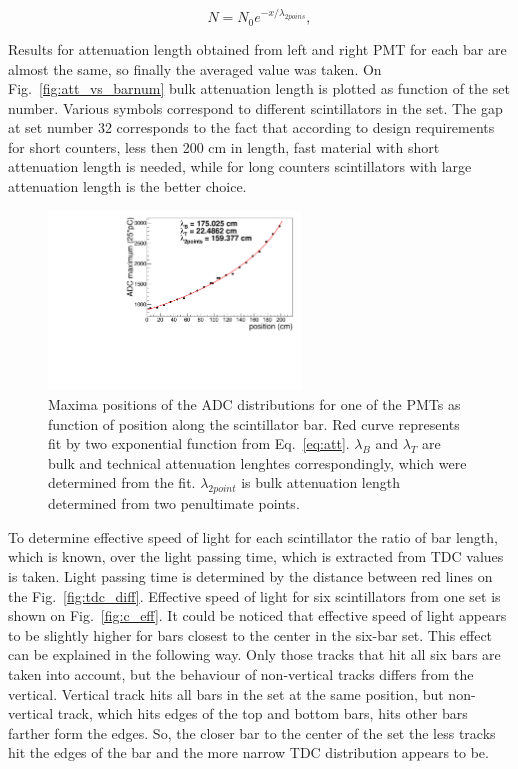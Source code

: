 \begin{equation}
N = N_{0}e^{-x/{\lambda_{2 poins}}}, \label{eq:att_2_points}
\end{equation}

Results for attenuation length obtained from left and right PMT for each bar are almost the same, so finally the averaged value was taken.
On Fig.~\ref{fig:att_vs_barnum} bulk attenuation length is plotted as function of the set number. Various symbols correspond to different scintillators in the set. The gap at set number 32 corresponds to the fact that according to design requirements for short counters, less then 200 cm in length, fast material with short attenuation length is needed, while for long counters scintillators with large attenuation length is the better choice.

\begin{figure}[]
\centering
\includegraphics[width=0.6\textwidth]{gleb/fig_gleb_att_length/att_length.pdf}
\caption{Maxima positions of the ADC distributions for one of the PMTs as function of position along the scintillator bar. Red curve represents fit by two exponential function from Eq.~\ref{eq:att}. $\lambda_{B}$ and $\lambda_{T}$ are bulk and technical attenuation lenghtes correspondingly, which were determined from the fit. $\lambda_{2point}$ is bulk attenuation length determined from two penultimate points. \label{fig:attlength}}
\end{figure}


To determine effective speed of light for each scintillator the ratio of bar length, which is known, over the light passing time, which is extracted from TDC values is taken.  Light passing time is determined by the distance between red lines on the Fig.~\ref{fig:tdc_diff}. Effective speed of light for six scintillators from one set is shown on Fig.~\ref{fig:c_eff}. It could be noticed that effective speed of light appears to be slightly higher for bars closest to the center in the six-bar set. This effect can be explained in the following way. Only those tracks that hit all six bars are taken into account, but the behaviour of non-vertical tracks differs from the vertical. Vertical track hits all bars in the set at the same position, but non-vertical track, which hits edges of the top and bottom bars, hits other bars farther form the edges. So, the closer bar to the center of the set the less tracks hit the edges of the bar and the more narrow TDC distribution appears to be.


